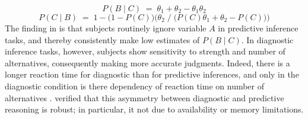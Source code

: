 \documentclass[10pt,letterpaper]{article}
\begin{document}
$$P(B\mid C) \;= \; \theta_1 + \theta_2 - \theta_1\theta_2$$
$$P(C \mid B) \;= \; 1- \big(1-P(C)\big)\Big(\theta_2\;/\;\big(P(C)\theta_1 + \theta_2  - P(C)\big)\Big)$$
The finding in \cite{Fernbach2011} is that subjects routinely ignore variable $A$ in predictive inference tasks, and thereby consistently make low estimates of $P(B\mid C)$. In diagnostic inference tasks, however, subjects show sensitivity to strength and number of alternatives, consequently making more accurate judgments. Indeed, there is a longer reaction time for diagnostic than for predictive inferences, and only in the diagnostic condition is there dependency of reaction time on number of alternatives \citep{Fernbach2010}. \cite{Fernbach2013} verified that this asymmetry between diagnostic and predictive reasoning is robust; in particular, it not due to availability or memory limitations.
\end{document}
